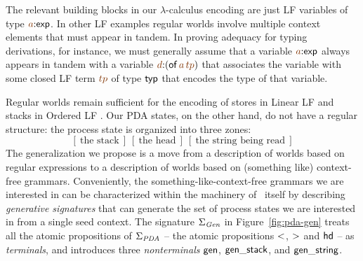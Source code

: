 The relevant building blocks in our $\lambda$-calculus encoding are
just LF variables of type $\lf{a}{:}{\sf exp}$. In other LF examples
regular worlds involve multiple context elements that must appear in
tandem. In proving adequacy for typing derivations, for instance, we
must generally assume that a variable $\lf{a}{:}{\sf exp}$ always
appears in tandem with a variable $\lf{d}{:}({\sf
  of}\,\lf{a}\,\lf{tp})$ that associates the variable with some closed
LF term $\lf{tp}$ of type ${\sf typ}$ that encodes the type of that
variable.

Regular worlds remain sufficient for the encoding of stores in Linear
LF \cite{cervesato02linear} and stacks in Ordered LF
\cite{polakow01ordered}. Our PDA states, on the other hand, do not have
a regular structure: the process state is organized into three
zones:
\[
[~\mbox{the stack}~]
~
[~\mbox{the head}~]
~
[~\mbox{the string being read}~]
\]
The generalization we propose is a move from a description
of worlds based on regular expressions to a description of worlds
based on (something like) context-free grammars. 
Conveniently, the something-like-context-free grammars we are interested
in can be
characterized within the machinery of \sls~itself by describing {\it
  generative signatures} that can generate the set of process states we
are interested in from a single seed context.  The signature
$\Sigma_{\it Gen}$ in Figure~\ref{fig:pda-gen} treats all the atomic
propositions of $\Sigma_{\it PDA}$ -- the atomic propositions ${\sf
  <}$, ${\sf >}$ and ${\sf hd}$ -- as {\it terminals}, and introduces
three {\it nonterminals} ${\sf gen}$, ${\sf gen\_stack}$, and ${\sf
  gen\_string}$.

